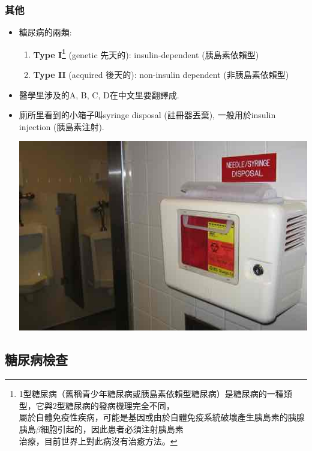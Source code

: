 \subsubsection*{其他}
\begin{itemize}
  \item 糖尿病的兩類:
  \begin{enumerate}
    \itemsep0em
    \item \textbf{Type I\footnote{1型糖尿病（舊稱青少年糖尿病或胰島素依賴型糖尿病）是糖尿病的一種類型，它與2型糖尿病的發病機理完全不同，\\屬於自體免疫性疾病，可能是基因或由於自體免疫系統破壞產生胰島素的胰腺胰島$\beta$細胞引起的，因此患者必須注射胰島素\\治療，目前世界上對此病沒有治癒方法。}} (genetic 先天的): insulin-dependent (胰島素依賴型)
    \item \textbf{Type II} (acquired 後天的): non-insulin dependent (非胰島素依賴型)
  \end{enumerate}
  \item 醫學里涉及的A, B, C, D在中文里要翻譯成.
  \item 廁所里看到的小箱子叫syringe disposal (註冊器丟棄), 一般用於insulin injection (胰島素注射).
  \begin{center}
    \includegraphics[scale=.6]{pics/syringe}
  \end{center}
\end{itemize}

\subsection{糖尿病檢查}
